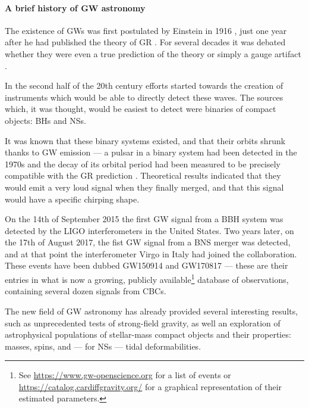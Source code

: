 \documentclass[main.tex]{subfiles}
\begin{document}

\paragraph{A brief history of GW astronomy}

The existence of \acp{GW} was first postulated by Einstein in 1916 \cites{1916SPAW.......688E}{1918SPAW.......154E}, just one year after he had published the theory of \ac{GR} \cite[]{einsteinFeldgleichungenGravitation1915}. 
For several decades it was debated whether they were even a true prediction of the theory or simply a gauge artifact \cite{kennefickTravelingSpeedThought2007}. 

In the second half of the 20th century efforts started towards the creation of instruments which would be able to directly detect these waves. 
The sources which, it was thought, would be easiest to detect were binaries of compact objects: \acp{BH} and \acp{NS}.

It was known that these binary systems existed, and that their orbits shrunk thanks to \ac{GW} emission --- a pulsar in a binary system had been detected in the 1970s and the decay of its orbital period had been measured to be precisely compatible with the \ac{GR} prediction \cites{hulseDiscoveryPulsarBinary1975}{taylorNewTestGeneral1982}.
Theoretical results indicated that they would emit a very loud signal when they finally merged, and that this signal would have a specific chirping shape. 

On the 14th of September 2015 the first \ac{GW} signal from a \ac{BBH} system was detected \cite[]{ligoscientificcollaborationandvirgocollaborationObservationGravitationalWaves2016} by the \ac{LIGO} interferometers in the United States. 
Two years later, on the 17th of August 2017, the fist \ac{GW} signal from a \ac{BNS} merger \cite{abbottGW170817ObservationGravitational2017}
was detected, and at that point the interferometer Virgo in Italy had joined the collaboration.
These events have been dubbed GW150914 and GW170817 --- these are their entries in what is now a growing, publicly available\footnote{See \url{https://www.gw-openscience.org} for a list of events or \url{https://catalog.cardiffgravity.org/} for a graphical representation of their estimated parameters.} database of observations, containing several dozen signals from \acp{CBC}.

The new field of \ac{GW} astronomy has already provided several interesting results, such as unprecedented tests of strong-field gravity, as well an exploration of astrophysical populations of stellar-mass compact objects and their properties: masses, spins, and --- for \acp{NS} --- tidal deformabilities. 
\end{document}
